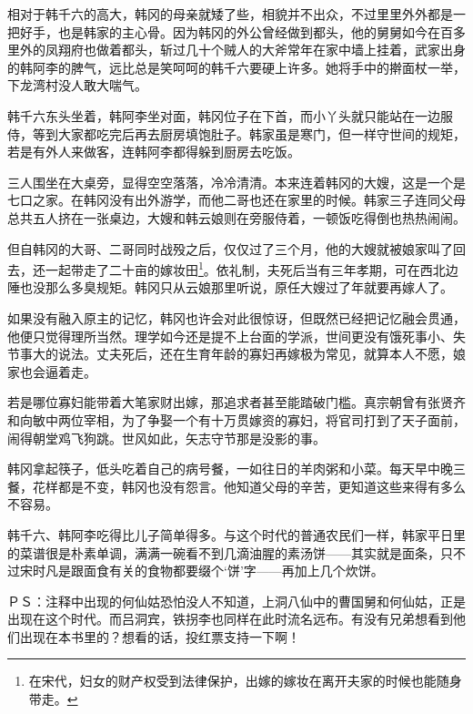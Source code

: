 相对于韩千六的高大，韩冈的母亲就矮了些，相貌并不出众，不过里里外外都是一把好手，也是韩家的主心骨。因为韩冈的外公曾经做到都头，他的舅舅如今在百多里外的凤翔府也做着都头，斩过几十个贼人的大斧常年在家中墙上挂着，武家出身的韩阿李的脾气，远比总是笑呵呵的韩千六要硬上许多。她将手中的擀面杖一举，下龙湾村没人敢大喘气。

韩千六东头坐着，韩阿李坐对面，韩冈位子在下首，而小丫头就只能站在一边服侍，等到大家都吃完后再去厨房填饱肚子。韩家虽是寒门，但一样守世间的规矩，若是有外人来做客，连韩阿李都得躲到厨房去吃饭。

三人围坐在大桌旁，显得空空落落，冷冷清清。本来连着韩冈的大嫂，这是一个是七口之家。在韩冈没有出外游学，而他二哥也还在家里的时候。韩家三子连同父母总共五人挤在一张桌边，大嫂和韩云娘则在旁服侍着，一顿饭吃得倒也热热闹闹。

但自韩冈的大哥、二哥同时战殁之后，仅仅过了三个月，他的大嫂就被娘家叫了回去，还一起带走了二十亩的嫁妆田\footnote{在宋代，妇女的财产权受到法律保护，出嫁的嫁妆在离开夫家的时候也能随身带走。}。依礼制，夫死后当有三年孝期，可在西北边陲也没那么多臭规矩。韩冈只从云娘那里听说，原任大嫂过了年就要再嫁人了。

如果没有融入原主的记忆，韩冈也许会对此很惊讶，但既然已经把记忆融会贯通，他便只觉得理所当然。理学如今还是提不上台面的学派，世间更没有饿死事小、失节事大的说法。丈夫死后，还在生育年龄的寡妇再嫁极为常见，就算本人不愿，娘家也会逼着走。

若是哪位寡妇能带着大笔家财出嫁，那追求者甚至能踏破门槛。真宗朝曾有张贤齐和向敏中两位宰相，为了争娶一个有十万贯嫁资的寡妇，将官司打到了天子面前，闹得朝堂鸡飞狗跳。世风如此，矢志守节那是没影的事。

韩冈拿起筷子，低头吃着自己的病号餐，一如往日的羊肉粥和小菜。每天早中晚三餐，花样都是不变，韩冈也没有怨言。他知道父母的辛苦，更知道这些来得有多么不容易。

韩千六、韩阿李吃得比儿子简单得多。与这个时代的普通农民们一样，韩家平日里的菜谱很是朴素单调，满满一碗看不到几滴油腥的素汤饼——其实就是面条，只不过宋时凡是跟面食有关的食物都要缀个‘饼’字——再加上几个炊饼。

ＰＳ：注释中出现的何仙姑恐怕没人不知道，上洞八仙中的曹国舅和何仙姑，正是出现在这个时代。而吕洞宾，铁拐李也同样在此时流名远布。有没有兄弟想看到他们出现在本书里的？想看的话，投红票支持一下啊！
